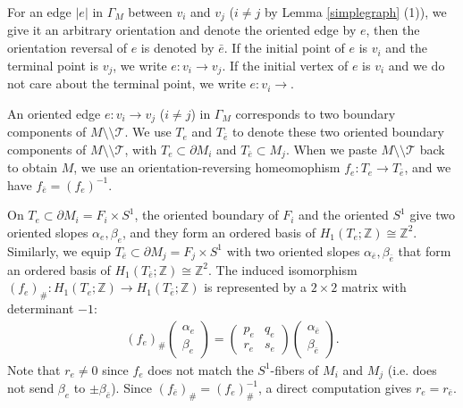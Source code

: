 \documentclass{amsart}
\numberwithin{equation}{section}
\theoremstyle{definition}
\begin{document}
For an edge $|e|$ in $\Gamma_M$ between $v_i$ and $v_j$ ($i\ne j$ by Lemma \ref{simplegraph} (1)), we give it an arbitrary orientation and denote the oriented edge by $e$, then the orientation reversal of $e$ is denoted by $\bar{e}$. If the initial point of $e$ is $v_i$ and the terminal point is $v_j$, we write $e:v_i\to v_j$. If the initial vertex of $e$ is $v_i$ and we do not care about the terminal point, we write $e:v_i\to $.

An oriented edge $e:v_i\to v_j$ ($i\ne j$) in $\Gamma_M$ corresponds to two boundary components of $M\setminus\setminus \mathcal{T}$. 
We use $T_e$ and $T_{\bar{e}}$ to denote these two oriented boundary components of $M\setminus\setminus \mathcal{T}$, with $T_e\subset \partial M_i$ and $T_{\bar{e}}\subset M_j$. When we paste $M\setminus\setminus \mathcal{T}$ back to obtain $M$, we use an orientation-reversing homeomophism $f_e:T_e\to T_{\bar{e}}$, and we have $f_{\bar{e}}=(f_e)^{-1}$.

On $T_e\subset \partial M_i=F_i\times S^1$, the oriented boundary of $F_i$ and the oriented $S^1$ give two oriented slopes $\alpha_e,\beta_e$, and they form an ordered basis of $H_1(T_e;\mathbb{Z})\cong \mathbb{Z}^2$. Similarly, we equip $T_{\bar{e}}\subset \partial M_j=F_j\times S^1$ with two oriented slopes $\alpha_{\bar{e}},\beta_{\bar{e}}$ that form an ordered basis of $H_1(T_{\bar{e}};\mathbb{Z})\cong \mathbb{Z}^2$. The induced isomorphism $(f_e)_{\#}:H_1(T_e;\mathbb{Z})\to H_1(T_{\bar{e}};\mathbb{Z})$ is represented by a $2\times 2$ matrix with determinant $-1$:
\begin{align}\label{2.1}
(f_e)_{\#}
\begin{pmatrix}
\alpha_e\\
\beta_e
\end{pmatrix}=
\begin{pmatrix}
p_e & q_e \\
r_e & s_e
\end{pmatrix}
\begin{pmatrix}
\alpha_{\bar{e}}\\
\beta_{\bar{e}}
\end{pmatrix}.
\end{align}
Note that $r_e\ne 0$ since $f_e$ does not match the $S^1$-fibers of $M_i$ and $M_j$ (i.e. does not send $\beta_e$ to $\pm\beta_{\bar{e}}$). Since $(f_{\bar{e}})_{\#}=(f_{e})_{\#}^{-1}$, a direct computation gives $r_e=r_{\bar{e}}$.
\end{document}
